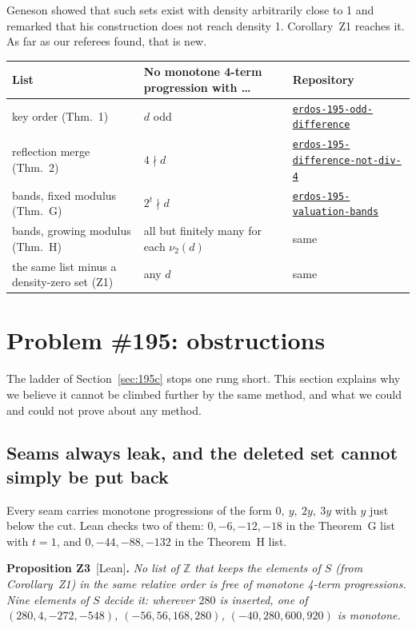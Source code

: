 \documentclass[11pt,letterpaper]{article}
\newcommand{\Z}{\mathbb{Z}}
\newcommand{\nut}{\nu_2}
\newcommand{\st}[1]{\textnormal{\textsf{\small[#1]}}}
\newcommand{\repo}[1]{\href{https://github.com/Alex-lop/#1}{\nolinkurl{#1}}}
\newenvironment{result}[2]%
  {\par\medskip\noindent\textbf{#1}\ \st{#2}\textbf{.}\enspace\itshape}%
  {\par\medskip}
\begin{document}
Geneson \cite{Gen26} showed that such sets exist with density arbitrarily close to 1 and remarked that his
construction does not reach density 1. Corollary~Z1 reaches it. As far as our referees found, that is new.

\begin{center}
\small
\begin{tabular}{L{2.05in}L{2.25in}L{1.55in}}
\toprule
List & No monotone 4-term progression with \dots & Repository \\
\midrule
key order (Thm.~1) & $d$ odd & \repo{erdos-195-odd-difference} \\
reflection merge (Thm.~2) & $4 \nmid d$ & \repo{erdos-195-difference-not-div-4} \\
bands, fixed modulus (Thm.~G) & $2^t \nmid d$ & \repo{erdos-195-valuation-bands} \\
bands, growing modulus (Thm.~H) & all but finitely many for each $\nut(d)$ & same \\
the same list minus a density-zero set (Z1) & any $d$ & same \\
\bottomrule
\end{tabular}
\end{center}

\section{Problem \#195: obstructions}\label{sec:195o}

The ladder of Section~\ref{sec:195c} stops one rung short. This section explains why we believe it cannot be
climbed further by the same method, and what we could and could not prove about any method.

\subsection{Seams always leak, and the deleted set cannot simply be put back}

Every seam carries monotone progressions of the form $0,\ y,\ 2y,\ 3y$ with $y$ just below the cut. Lean
checks two of them: $0, -6, -12, -18$ in the Theorem~G list with $t=1$, and $0, -44, -88, -132$ in the
Theorem~H list.

\begin{result}{Proposition Z3}{Lean}
No list of $\Z$ that keeps the elements of $S$ (from Corollary~Z1) in the same relative order is free of
monotone 4-term progressions. Nine elements of $S$ decide it: wherever $280$ is inserted, one of
$(280, 4, -272, -548)$, $(-56, 56, 168, 280)$, $(-40, 280, 600, 920)$ is monotone.
\end{result}
\end{document}
